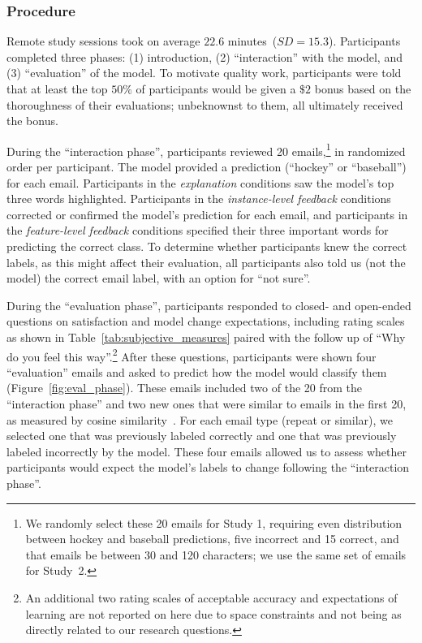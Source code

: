 \subsubsection{Procedure}
Remote study sessions took on average $22.6$ minutes~($SD=15.3$). Participants completed three phases: (1) introduction, (2) ``interaction'' with the model, and (3) ``evaluation'' of the model. To motivate quality work, participants were told that at least the top $50\%$ of participants would be given a $\$2$ bonus based on the thoroughness of their evaluations; unbeknownst to them, all ultimately received the bonus. 

\FigureMethodInteractPhase

During the ``interaction phase'', participants reviewed 20 emails,\footnote{We randomly select these 20 emails for Study 1, requiring even distribution between hockey and baseball predictions, five incorrect and 15 correct, and that emails be between 30 and 120 characters; we use the same set of emails for Study~2.} in randomized order per participant. 
%
The model provided a prediction (``hockey'' or ``baseball'') for each email. Participants in the \textit{explanation} conditions saw the model's top three words highlighted. Participants in the \textit{instance-level feedback} conditions corrected or confirmed the model's prediction for each email, and participants in the \textit{feature-level feedback} conditions specified their three important words for predicting the correct class. To determine whether participants knew the correct labels, as this might affect their evaluation, all participants also told us (not the model) the correct email label, with an option for ``not sure''. 

\FigureMethodEvalPhase

During the ``evaluation phase'', participants responded to closed- and open-ended questions on satisfaction and model change expectations, including rating scales as shown in Table~\ref{tab:subjective_measures} paired with the follow up of ``Why do you feel this way''.\footnote{An additional two rating scales of acceptable accuracy and expectations of learning are not reported on here due to space constraints and not being as directly related to our research questions.} After these questions, participants were shown four ``evaluation'' emails and asked to predict how the model would classify them (Figure~\ref{fig:eval_phase}). These emails included two of the 20 from the ``interaction phase'' and two new ones that were similar to emails in the first 20, as measured by cosine similarity~\cite{Huang2008SimilarityClustering}. For each email type (repeat or similar), we selected one that was previously labeled correctly and one that was previously labeled incorrectly by the model. These four emails allowed us to assess whether participants would expect the model's labels to change following the ``interaction phase''.

